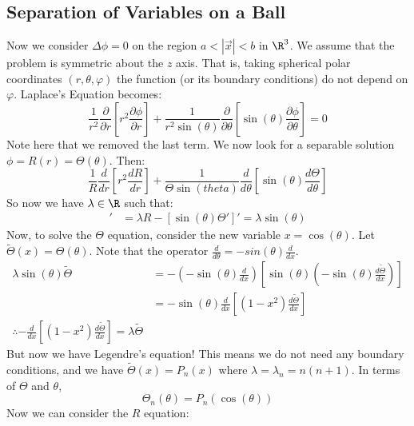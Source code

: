 \documentclass[../Main.tex]{subfiles}
\begin{document}
\subsection{Separation of Variables on a Ball}
Now we consider $\Delta \phi = 0$ on the region $a < |\vec{x}| < b$ in $\R^3$. We assume that the problem is symmetric about the $z$ axis. That is, taking spherical polar coordinates $(r, \theta, \varphi)$ the function (or its boundary conditions) do not depend on $\varphi$. Laplace's Equation becomes:
\begin{equation*}
    \frac{1}{r^2} \frac{\partial }{\partial r}\left[r^2 \frac{\partial \phi}{\partial r}\right] + \frac{1}{r^2 \sin(\theta)} \frac{\partial}{\partial \theta} \left[\sin(\theta) \frac{\partial \phi}{\partial \theta}\right] = 0
\end{equation*}
Note here that we removed the last term. We now look for a separable solution $\phi = R(r) = \Theta(\theta)$. Then:
\begin{equation*}
    \frac{1}{R} \frac{d}{dr} \left[r^2 \frac{dR}{dr}\right] + \frac{1}{\Theta \sin(theta)} \frac{d}{d\theta} \left[\sin(\theta) \frac{d\Theta}{d\theta}\right]
\end{equation*}
So now we have $\lambda \in \R$ such that:
\begin{align*}
    [r^2 R']' &= \lambda R
    -[\sin(\theta) \Theta']' = \lambda \sin(\theta)
\end{align*}
Now, to solve the $\Theta$ equation, consider the new variable $x = \cos(\theta)$. Let $\tilde{\Theta}(x) = \Theta(\theta)$. Note that the operator $\frac{d}{d\theta} = -sin(\theta) \frac{d}{dx}$.
\begin{align*}
    \lambda \sin(\theta) \tilde{\Theta} &= -\left(-\sin(\theta) \frac{d}{dx}\right) \left[\sin(\theta) \left(-\sin(\theta) \frac{d\tilde{\Theta}}{dx}\right)\right] \\
    &= -\sin(\theta) \frac{d}{dx} \left[(1 - x^2) \frac{d\tilde{\Theta}}{dx}\right] \\
    \therefore -\frac{d}{dx} \left[(1 - x^2) \frac{d\tilde{\Theta}}{dx}\right] = \lambda \tilde{\Theta}
\end{align*}
But now we have Legendre's equation! This means we do not need any boundary conditions, and we have $\tilde{\Theta}(x) = P_n(x)$ where $\lambda = \lambda_n = n(n+1)$. In terms of $\Theta$ and $\theta$,
\begin{equation*}
    \Theta_n(\theta) = P_n(\cos(\theta))
\end{equation*}
Now we can consider the $R$ equation:
\end{document}

